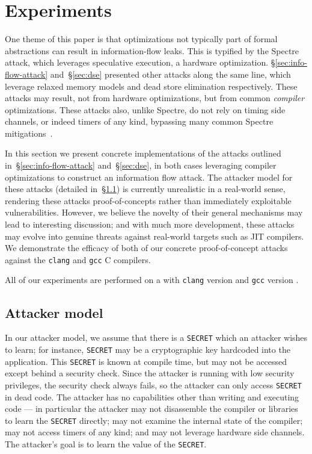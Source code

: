 \section{Experiments}
\label{sec:experiments}

One theme of this paper is that optimizations not typically part of formal
abstractions can result in information-flow leaks.
This is typified by the Spectre attack, which leverages speculative execution,
a hardware optimization.
\S\ref{sec:info-flow-attack} and~\S\ref{sec:dse} presented other attacks
along the same line, which leverage relaxed memory models and dead store
elimination respectively.
These attacks may result,
not from hardware optimizations, but from common \emph{compiler} optimizations.
These attacks also, unlike Spectre, do not rely on timing side channels, or
indeed timers of any kind, bypassing many common Spectre mitigations~\cite{???}.

In this section we present concrete implementations of the attacks outlined
in~\S\ref{sec:info-flow-attack} and~\S\ref{sec:dse}, in both cases
leveraging compiler optimizations to construct an information flow attack.
The attacker model for these attacks (detailed in~\S\ref{subsec:attacker-model})
is currently unrealistic in a
real-world sense, rendering these attacks proof-of-concepts rather than
immediately exploitable vulnerabilities.
However, we believe the novelty of their general mechanisms may lead to
interesting discussion; and with much more development, these attacks may
evolve into genuine threats against real-world targets such as JIT compilers.
We demonstrate the efficacy of both of our concrete proof-of-concept
attacks against
the \verb|clang| and \verb|gcc| C compilers.

All of our experiments are performed on a  with
\verb|clang| version  and \verb|gcc| version .

\subsection{Attacker model}
\label{subsec:attacker-model}

In our attacker model, we assume that there is a \verb|SECRET| which an
attacker wishes to learn; for instance, \verb|SECRET| may be a cryptographic
key hardcoded into the application.
This \verb|SECRET| is known at compile time, but may not be
accessed except behind a security check.
Since the attacker is running with low security privileges,
the security check always fails,
so the attacker can only access \verb|SECRET| in dead code.
The attacker has no capabilities other than writing and executing code --- in
particular the attacker may not disassemble the compiler or libraries to learn
the \verb|SECRET| directly; may not examine the internal state of the compiler;
may not access timers of any kind; and may not leverage hardware side channels.
The attacker's goal is to learn the value of the \verb|SECRET|.

